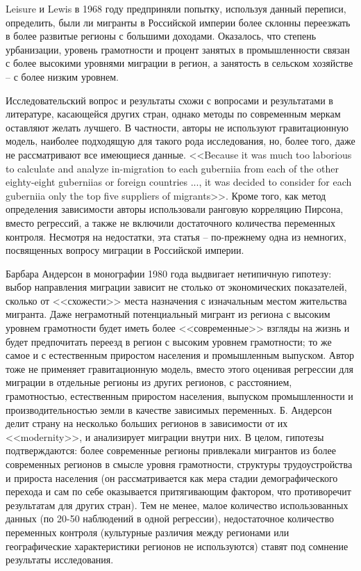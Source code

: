 \documentclass[a4paper,12pt]{article}
\begin{document}
Leisure и Lewis в 1968 году предприняли попытку, используя данный переписи, определить, были ли мигранты в Российской империи более склонны переезжать в более развитые регионы с большими доходами. \citep{leasure_internal_1968} Оказалось, что степень урбанизации, уровень грамотности и процент занятых в промышленности связан с более высокими уровнями миграции в регион, а занятость в сельском хозяйстве – с более низким уровнем.


Исследовательский вопрос и результаты схожи с вопросами и результатами в литературе, касающейся других стран, однако методы по современным меркам оставляют желать лучшего. В частности, авторы не используют гравитационную модель, наиболее подходящую для такого рода исследования, но, более того, даже не рассматривают все имеющиеся данные. <<Because it was much too laborious to calculate and analyze in-migration to each guberniia from each of the other eighty-eight guberniias or foreign countries ..., it was decided to consider for each guberniia only the top five suppliers of migrants>>. Кроме того, как метод определения зависимости авторы использовали ранговую корреляцию Пирсона, вместо регрессий, а также не включили достаточного количества переменных контроля. Несмотря на недостатки, эта статья -- по-прежнему одна из немногих, посвященных вопросу миграции в Российской империи.

Барбара Андерсон в монографии 1980 года выдвигает нетипичную гипотезу: выбор направления миграции зависит не столько от экономических показателей, сколько от <<схожести>> места назначения с изначальным местом жительства мигранта. Даже неграмотный потенциальный мигрант из региона с высоким уровнем грамотности будет иметь более <<современные>> взгляды на жизнь и будет предпочитать переезд в регион с высоким уровнем грамотности; то же самое и с естественным приростом населения и промышленным выпуском. Автор тоже не применяет гравитационную модель, вместо этого оценивая регрессии для миграции в отдельные регионы из других регионов, с расстоянием, грамотностью, естественным приростом населения, выпуском промышленности и производительностью земли в качестве зависимых переменных. Б. Андерсон делит страну на несколько больших регионов в зависимости от их <<modernity>>, и анализирует миграции внутри них. В целом, гипотезы подтверждаются: более современные регионы привлекали мигрантов из более современных регионов в смысле уровня грамотности, структуры трудоустройства и прироста населения (он рассматривается как мера стадии демографического перехода и сам по себе оказывается притягивающим фактором, что противоречит результатам для других стран).
Тем не менее, малое количество использованных данных (по 20-50 наблюдений в одной регрессии), недостаточное количество переменных контроля (культурные различия между регионами или географические характеристики регионов не используются) ставят под сомнение результаты исследования.
\end{document}
